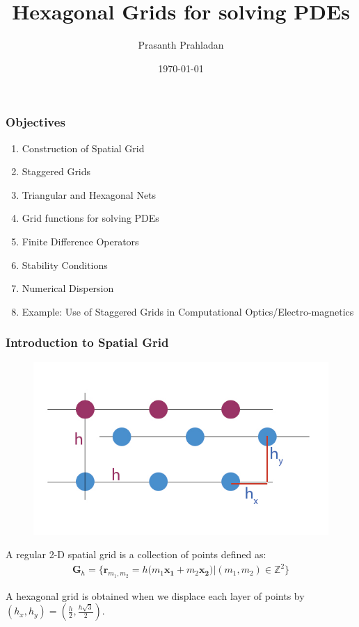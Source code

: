 \documentclass{beamer}
\title[APPM 7400: HW\#1]{Hexagonal Grids for solving PDEs} %
\author[Prasanth Prahladan]{Prasanth Prahladan} %
\institute[CU Boulder] %
{University of Colorado Boulder  \\ %
\medskip
}
\date{\today} %
\begin{document}
\scriptsize

\begin{frame}
\titlepage %
\end{frame}


\begin{frame}
\frametitle{Objectives}
\begin{enumerate}
\item Construction of Spatial Grid
\item Staggered Grids
\item Triangular and Hexagonal Nets
\item Grid functions for solving PDEs
\item Finite Difference Operators
\item Stability Conditions 
\item Numerical Dispersion
\item Example: Use of Staggered Grids in Computational Optics/Electro-magnetics
\end{enumerate}

\end{frame}


\begin{frame}
\frametitle{Introduction to Spatial Grid}
\begin{figure}
\includegraphics[scale=0.2]{./images/jpgSpatialGrid.jpg}
\label{fig:spatialGrid}
\end{figure}

A regular 2-D spatial grid is a collection of points defined as:
\begin{align*}
\mathbf{G}_h = \bigg\{\mathbf{r}_{m_1, m_2} = h \big( m_1 \mathbf{x_1} + m_2 \mathbf{x_2} \big) | (m_1,m_2) \in \mathbb{Z}^2\bigg\}
\end{align*}

A hexagonal grid is obtained when we displace each layer of points by $(h_x, h_y) = (\frac{h}{2}, \frac{h\sqrt{3}}{2})$.
\end{frame}
\end{document}
